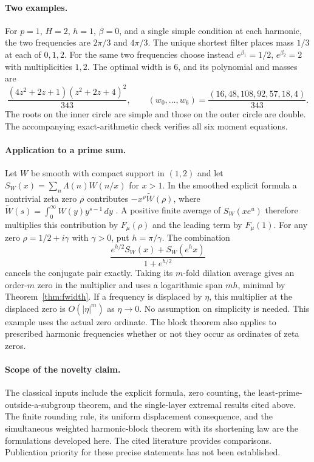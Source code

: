 \documentclass[11pt,letterpaper]{article}
\theoremstyle{remark}\newtheorem{remark}[theorem]{Remark}
\begin{document}
\paragraph{Two examples.}
For $p=1$, $H=2$, $h=1$, $\beta=0$, and a single simple condition at each harmonic, the two frequencies are $2\pi/3$ and $4\pi/3$. The unique shortest filter places mass $1/3$ at each of $0,1,2$. For the same two frequencies choose instead $e^{\beta_1}=1/2$, $e^{\beta_2}=2$ with multiplicities $1,2$. The optimal width is $6$, and its polynomial and masses are
\[
 \frac{(4z^2+2z+1)(z^2+2z+4)^2}{343},
 \qquad (w_0,\ldots,w_6)=\frac{(16,48,108,92,57,18,4)}{343}.
\]
The roots on the inner circle are simple and those on the outer circle are double. The accompanying exact-arithmetic check verifies all six moment equations.



\paragraph{Application to a prime sum.}
Let $W$ be smooth with compact support in $(1,2)$ and let $S_W(x)=\sum_n\Lambda(n)W(n/x)$ for $x>1$. In the smoothed explicit formula a nontrivial zeta zero $\rho$ contributes $-x^\rho\widetilde W(\rho)$, where $\widetilde W(s)=\int_0^\infty W(y)y^{s-1}\,dy$ \cite[Thm.~7.1]{green}. A positive finite average of $S_W(xe^u)$ therefore multiplies this contribution by $F_\mu(\rho)$ and the leading term by $F_\mu(1)$. For any zero $\rho=1/2+i\gamma$ with $\gamma>0$, put $h=\pi/\gamma$. The combination
\[
 \frac{e^{h/2}S_W(x)+S_W(e^hx)}{1+e^{h/2}}
\]
cancels the conjugate pair exactly. Taking its $m$-fold dilation average gives an order-$m$ zero in the multiplier and uses a logarithmic span $mh$, minimal by Theorem~\ref{thm:fwidth}. If a frequency is displaced by $\eta$, this multiplier at the displaced zero is $O(|\eta|^m)$ as $\eta\to0$. No assumption on simplicity is needed. This example uses the actual zero ordinate. The block theorem also applies to prescribed harmonic frequencies whether or not they occur as ordinates of zeta zeros.


\paragraph{Scope of the novelty claim.}
The classical inputs include the explicit formula, zero counting, the least-prime-outside-a-subgroup theorem, and the single-layer extremal results cited above. The finite rounding rule, its uniform displacement consequence, and the simultaneous weighted harmonic-block theorem with its shortening law are the formulations developed here. The cited literature provides comparisons. Publication priority for these precise statements has not been established.
\end{document}

